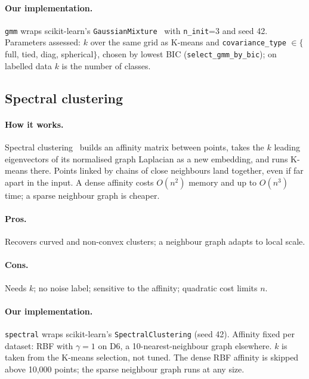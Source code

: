 \paragraph{Our implementation.} \texttt{gmm} wraps scikit-learn's \texttt{GaussianMixture}~\cite{pedregosa2011}
with \texttt{n\_init}=3 and seed 42. Parameters assessed: $k$ over the same grid as K-means and
\texttt{covariance\_type} $\in\{$full, tied, diag, spherical$\}$, chosen by lowest BIC
(\texttt{select\_gmm\_by\_bic}); on labelled data $k$ is the number of classes.

\subsection{Spectral clustering}
\paragraph{How it works.} Spectral clustering~\cite{ng2002} builds an affinity matrix between points,
takes the $k$ leading eigenvectors of its normalised graph Laplacian as a new embedding, and runs K-means
there. Points linked by chains of close neighbours land together, even if far apart in the input. A dense
affinity costs $O(n^2)$ memory and up to $O(n^3)$ time; a sparse neighbour graph is cheaper.
\paragraph{Pros.} Recovers curved and non-convex clusters; a neighbour graph adapts to local scale.
\paragraph{Cons.} Needs $k$; no noise label; sensitive to the affinity; quadratic cost limits $n$.
\paragraph{Our implementation.} \texttt{spectral} wraps scikit-learn's \texttt{SpectralClustering}
(seed 42). Affinity fixed per dataset: RBF with $\gamma=1$ on D6, a 10-nearest-neighbour graph elsewhere.
$k$ is taken from the K-means selection, not tuned. The dense RBF affinity is skipped above 10{,}000
points; the sparse neighbour graph runs at any size.

